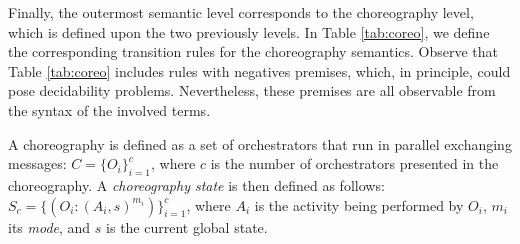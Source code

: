 \begin{table}[!ht]
\centering
{\scriptsize
{}}
\caption{\label{tab:noti}Action and delay transition rules for orchestrators.}
\vspace{-0.8cm}
\end{table}
\newpage

Finally, the outermost semantic level corresponds to the choreography level, which is defined upon the two previously levels. In Table \ref{tab:coreo}, we define the corresponding transition rules for the choreography semantics. Observe that Table \ref{tab:coreo} includes rules with negatives premises, which, in principle, could pose decidability problems. Nevertheless, these premises are all observable from the syntax of the involved terms.

\begin{definition}
A choreography is defined as a set of orchestrators that run in parallel exchanging messages: $C=\{O_i\}_{i=1}^c$, where $c$ is the number of orchestrators
presented in the choreography. A {\it choreography state} is then defined as follows:
$S_c=\{(O_i:(A_i, s)^{m_i})\}_{i=1}^c$, where $A_i$ is the activity being performed by $O_i$, $m_{i}$ its \emph{mode}, and $s$ is the current global state.
\vspace{0.1cm}
\end{definition}

